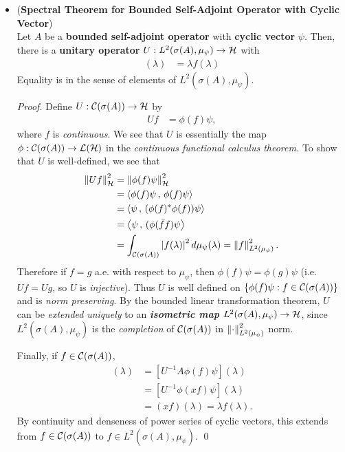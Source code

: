 \documentclass[11pt]{article}
\begin{document}
\begin{itemize}
\item \begin{lemma} (\textbf{Spectral Theorem for Bounded Self-Adjoint Operator with Cyclic Vector}) \citep{reed1980methods}\\
Let $A$ be a \textbf{bounded self-adjoint operator} with \textbf{cyclic vector} $\psi$.  Then, there is a \textbf{unitary operator} $U:  L^2(\sigma(A), \mu_{\psi}) \rightarrow {\mathcal H}$ with
\begin{align*}
[U^{-1} A U f](\lambda) &= \lambda f(\lambda)
\end{align*} 
Equality is in the sense of elements of $L^2(\sigma(A), \mu_{\psi})$. 
\end{lemma}
\begin{proof}
Define $U: {\mathcal C}(\sigma(A)) \to {\mathcal H}$ by 
\begin{align}
Uf &= \phi(f)\psi, \label{eqn: unitary_cyclic_functional_calculus}
\end{align} where $f$ is \emph{continuous}. We see that $U$ is essentially the map $\phi: {\mathcal C}(\sigma(A)) \to {\mathcal L}({\mathcal H})$ in the \emph{continuous functional calculus theorem.} To show that $U$ is well-defined, we see that 
\begin{align*}
\left\|Uf\right\|_{{\mathcal H}}^2 &= \left\| \phi(f)\psi \right\|_{{\mathcal H}}^2 \\
&= \left\langle  \phi(f)\psi \,,\,  \phi(f)\psi  \right\rangle \\
&= \left\langle \psi\,,\, ( \phi(f)^{*}\phi(f))\psi  \right\rangle \\
&=  \left\langle \psi\,,\, (\phi(\bar{f}f)\psi  \right\rangle \\
&= \int_{ {\mathcal C}(\sigma(A))} \left\lvert f(\lambda) \right\rvert^2 d\mu_{\psi}(\lambda) = \left\|f\right\|_{L^2(\mu_{\psi})}^2.
\end{align*} Therefore if $f = g$ a.e. with respect to $\mu_{\psi}$, then $\phi(f)\psi  = \phi(g)\psi$ (i.e. $Uf = Ug$, so $U$ is \emph{injective}). Thus $U$ is 
well defined on $\left\{ \phi(f)\psi : f \in {\mathcal C}(\sigma(A))\right\}$ and is \emph{norm preserving}. By the bounded linear transformation theorem, $U$ can be \emph{extended} \emph{uniquely} to an \emph{\textbf{isometric map}} $L^2(\sigma(A), \mu_{\psi}) \to {\mathcal H}$, since $L^2(\sigma(A), \mu_{\psi})$ is the \emph{completion} of ${\mathcal C}(\sigma(A))$ in $ \left\|\cdot\right\|_{L^2(\mu_{\psi})}^2$ norm.

Finally, if $f \in  {\mathcal C}(\sigma(A))$,
\begin{align*}
[U^{-1} A U f](\lambda) &= [U^{-1}A \phi(f)\psi](\lambda) \\
&= [U^{-1}\phi(xf)\psi](\lambda) \\
&= (xf)(\lambda) = \lambda f(\lambda).
\end{align*} By continuity and denseness of power series of cyclic vectors, this extends from $f \in {\mathcal C}(\sigma(A))$ to $f \in L^2(\sigma(A), \mu_{\psi})$.  \qed
\end{proof}


\end{itemize}
\end{document}
